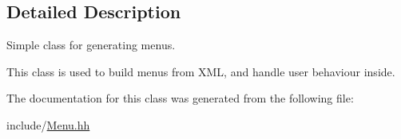 \subsection{Detailed Description}
Simple class for generating menus. 

This class is used to build menus from X\+ML, and handle user behaviour inside. 

The documentation for this class was generated from the following file\+:\begin{DoxyCompactItemize}
\item 
include/\hyperlink{Menu_8hh}{Menu.\+hh}\end{DoxyCompactItemize}

